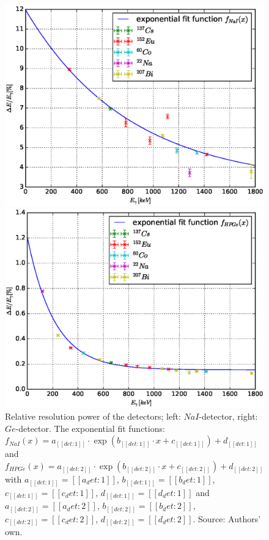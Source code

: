 \documentclass[a4paper]{article}
\begin{document}
\begin{figure}[H]
	\begin{minipage}[t]{0.5\textwidth}
		\begin{center}
		\includegraphics[width=1.0\textwidth]{plots/relative_resolution_NaI.eps}
		\end{center}
	\end{minipage}
	\begin{minipage}[t]{0.5\textwidth}
		\begin{center}
		\includegraphics[width=1.0\textwidth]{plots/relative_resolution_HPGe.eps}
		\end{center}
	\end{minipage}
	\caption{Relative resolution power of the detectors; left: $NaI$-detector, right: $Ge$-detector. The exponential fit functions: $f_{NaI}(x) = a_{[[det:1]]} \cdot \exp \left( b_{[[det:1]]} \cdot x + c_{[[det:1]]} \right) + d_{[[det:1]]}$ and $f_{HPGe}(x) = a_{[[det:2]]} \cdot \exp \left( b_{[[det:2]]} \cdot x + c_{[[det:2]]} \right) + d_{[[det:2]]}$ with $a_{[[det:1]]} = [[a_det:1]]$, $b_{[[det:1]]} = [[b_det:1]]$, $c_{[[det:1]]} = [[c_det:1]]$, $d_{[[det:1]]} = [[d_det:1]]$ and $a_{[[det:2]]} = [[a_det:2]]$, $b_{[[det:2]]} = [[b_det:2]]$, $c_{[[det:2]]} = [[c_det:2]]$, $d_{[[det:2]]} = [[d_det:2]]$. Source: Authors' own.}
	\label{fig:relative_resolution}
\end{figure}
\end{document}
